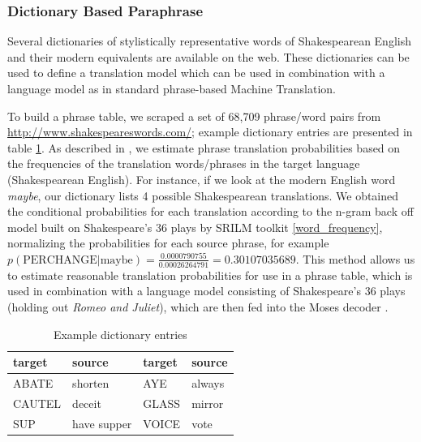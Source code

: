 \documentclass[10pt,a5paper,twoside]{article}
\begin{document}
\subsubsection{Dictionary Based Paraphrase}
\label{dictionary_baseline}
Several dictionaries of stylistically representative words of Shakespearean English and their modern equivalents are available on the web.  
These dictionaries can be used to define a translation model which can be used in combination with a language model as in standard phrase-based Machine
Translation.


To build a phrase table, we scraped a set of 68,709 phrase/word pairs from \url{http://www.shakespeareswords.com/}; 
example dictionary entries are presented in table \ref{dictionary_example}. 
As described in \cite{Koehn00}, we estimate phrase translation probabilities
based on the frequencies of the translation words/phrases in the target language (Shakespearean English).
For instance, if we look at the modern English word \emph{maybe}, our dictionary lists 4 possible Shakespearean translations. 
We obtained the conditional probabilities for each translation according to the n-gram back off model built on Shakespeare's 
36 plays by SRILM toolkit \cite{Stolcke02} \ref{word_frequency}, 
normalizing the probabilities for each source phrase, for example $p(\text{PERCHANGE}|\text{maybe}) = \frac{0.0000790755}{0.00026264791} = 0.30107035689$. 
This method allows us to estimate reasonable translation probabilities for use in a phrase table, which is used in combination 
with a language model consisting of Shakespeare's 36 plays (holding out {\em Romeo and Juliet}), which are then fed into the Moses decoder
\cite{Koehn07}.

\begin{table}
  \begin{center}
  \begin{tabular}{|l|l||l|l|}
    \hline
    target & source & target & source \\
    \hline
    \hline
    ABATE & shorten & AYE & always \\
    \hline
    CAUTEL & deceit & GLASS & mirror \\
    \hline
    SUP & have supper & VOICE & vote \\
    \hline
  \end{tabular}
  \end{center}
  \caption{Example dictionary entries}
  \label{dictionary_example}
\end{table}
\end{document}
